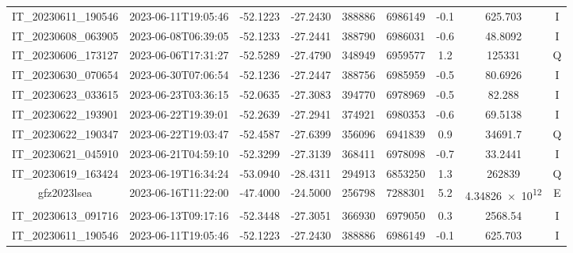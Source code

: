 \begin{center}
\begin{longtable}{ccccS[table-format=6.0]S[table-format=7.0]ccc}
\begin{adjustbox}{width=\textwidth}
    IT\_20230611\_190546 & 2023-06-11T19:05:46 & -52.1223 & -27.2430 & 388886 & 6986149 & -0.1 & \num[round-precision=3,round-mode=figures,scientific-notation=true]{625.703} & I \\
    IT\_20230608\_063905 & 2023-06-08T06:39:05 & -52.1233 & -27.2441 & 388790 & 6986031 & -0.6 & \num[round-precision=3,round-mode=figures,scientific-notation=true]{48.8092} & I \\
    IT\_20230606\_173127 & 2023-06-06T17:31:27 & -52.5289 & -27.4790 & 348949 & 6959577 & 1.2 & \num[round-precision=3,round-mode=figures,scientific-notation=true]{125331} & Q \\               IT\_20230630\_070654 & 2023-06-30T07:06:54 & -52.1236 & -27.2447 & 388756 & 6985959 & -0.5 & \num[round-precision=3,round-mode=figures,scientific-notation=true]{80.6926} & I \\
    IT\_20230623\_033615 & 2023-06-23T03:36:15 & -52.0635 & -27.3083 & 394770 & 6978969 & -0.5 & \num[round-precision=3,round-mode=figures,scientific-notation=true]{82.288} & I \\
    IT\_20230622\_193901 & 2023-06-22T19:39:01 & -52.2639 & -27.2941 & 374921 & 6980353 & -0.6 & \num[round-precision=3,round-mode=figures,scientific-notation=true]{69.5138} & I \\
    IT\_20230622\_190347 & 2023-06-22T19:03:47 & -52.4587 & -27.6399 & 356096 & 6941839 & 0.9 & \num[round-precision=3,round-mode=figures,scientific-notation=true]{34691.7} & Q \\
    IT\_20230621\_045910 & 2023-06-21T04:59:10 & -52.3299 & -27.3139 & 368411 & 6978098 & -0.7 & \num[round-precision=3,round-mode=figures,scientific-notation=true]{33.2441} & I \\
    IT\_20230619\_163424 & 2023-06-19T16:34:24 & -53.0940 & -28.4311 & 294913 & 6853250 & 1.3 & \num[round-precision=3,round-mode=figures,scientific-notation=true]{262839} & Q \\
    gfz2023lsea & 2023-06-16T11:22:00 & -47.4000 & -24.5000 & 256798 & 7288301 & 5.2 & \num[round-precision=3,round-mode=figures,scientific-notation=true]{4.34826e+12} & E \\
    IT\_20230613\_091716 & 2023-06-13T09:17:16 & -52.3448 & -27.3051 & 366930 & 6979050 & 0.3 & \num[round-precision=3,round-mode=figures,scientific-notation=true]{2568.54} & I \\
    IT\_20230611\_190546 & 2023-06-11T19:05:46 & -52.1223 & -27.2430 & 388886 & 6986149 & -0.1 & \num[round-precision=3,round-mode=figures,scientific-notation=true]{625.703} & I \\

\end{adjustbox}
\end{longtable}
\end{center}
